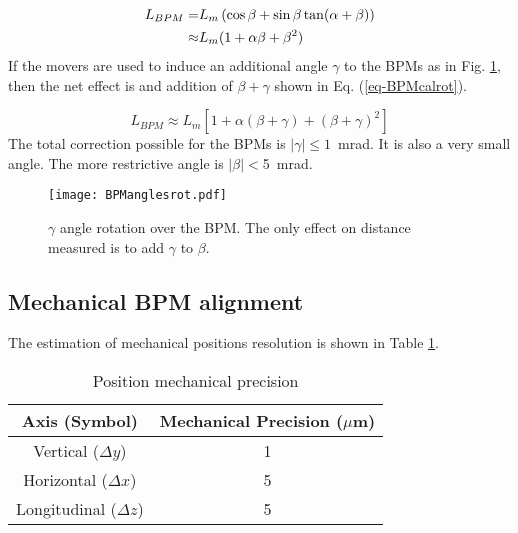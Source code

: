 \begin{align}
 L_{BPM}=&L_m\left(\cos\beta+\sin\beta\tan(\alpha+\beta)\right)\notag\\
 \approx&L_m(1+\alpha\beta+\beta^2)\label{eq:BPMcal}
\end{align}
If the movers are used to induce an additional angle $\gamma$ to the BPMs as in Fig. \ref{f-BPManglesrot}, then the net effect is and addition of $\beta+\gamma$ shown in Eq. (\ref{eq-BPMcalrot}).\par
\begin{equation}
 L_{BPM}\approx L_m[1+\alpha(\beta+\gamma)+(\beta+\gamma)^2]\label{eq-BPMcalrot}
\end{equation}
The total correction possible for the BPMs is $|\gamma|\leq1$~mrad. It is also a very small angle. The more restrictive angle is $|\beta|<$5~mrad.\par
\begin{figure}[htb]
 \centering
  \texttt{[image: BPManglesrot.pdf]}\caption{$\gamma$ angle rotation over the BPM. The only effect on distance measured is to add $\gamma$ to $\beta$.}\label{f-BPManglesrot}
\end{figure}
\subsection{Mechanical BPM alignment}\label{s:mechanical}
The estimation of mechanical positions resolution is shown in Table \ref{mechprec}.\par
\begin{table}[htb]
\begin{center}
 \begin{tabular}{|c|c|}\hline
  Axis (Symbol) & Mechanical Precision ($\mu$m)\\\hline
  Vertical ($\Delta y$)& 1\\
  Horizontal ($\Delta x$) & 5\\
  Longitudinal ($\Delta z$) & 5 \\\hline
 \end{tabular}\caption{Position mechanical precision}\label{mechprec}
 \end{center}
\end{table}
\pagebreak
